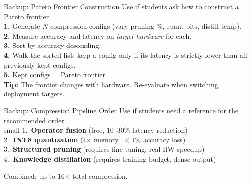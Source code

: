 \documentclass[aspectratio=169, 12pt]{beamer}
\begin{document}
\begin{frame}{Backup: Pareto Frontier Construction}
\small
Use if students ask how to construct a Pareto frontier.\\[0.1cm]
{\footnotesize
\textbf{1.} Generate $N$ compression configs (vary pruning \%, quant bits, distill temp).\\
\textbf{2.} Measure accuracy and latency on \emph{target hardware} for each.\\
\textbf{3.} Sort by accuracy descending.\\
\textbf{4.} Walk the sorted list: keep a config only if its latency is strictly lower than all previously kept configs.\\
\textbf{5.} Kept configs = Pareto frontier.\\[0.05cm]
\textbf{Tip:} The frontier changes with hardware. Re-evaluate when switching deployment targets.
}
\end{frame}

\begin{frame}{Backup: Compression Pipeline Order}
\small
Use if students need a reference for the recommended order.\\small 1.\ \textbf{Operator fusion} (free, 10--30\% latency reduction)\\ 2.\ \textbf{INT8 quantization} (4$\times$ memory, $<$1\% accuracy loss)\\ 3.\ \textbf{Structured pruning} (requires fine-tuning, real HW speedup)\\ 4.\ \textbf{Knowledge distillation} (requires training budget, dense output)

 Combined: up to 16$\times$ total compression.
\end{frame}
\end{document}
